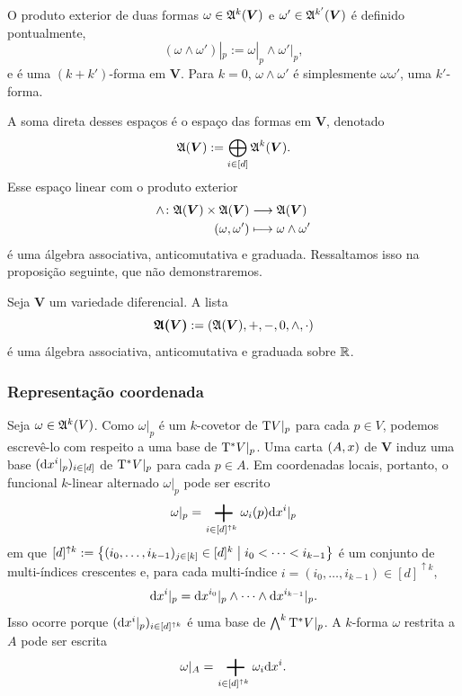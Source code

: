O produto exterior de duas formas $\omega \in \mathfrak{A}^k (\bm V)$ e $\omega' \in \mathfrak{A}^{k'} (\bm V)$ é definido pontualmente,
	\begin{equation*}
	(\omega \wedge \omega')|_p := \omega|_p \wedge \omega'|_p,
	\end{equation*}
e é uma $(k+k')$-forma em $\bm V$. Para $k=0$, $\omega \wedge \omega'$ é simplesmente $\omega\omega'$, uma $k'$-forma.

A soma direta desses espaços é o espaço das formas em $\bm V$, denotado
	\begin{equation*}
	\mathfrak{A} (\bm V) := \bigoplus_{i \in [d]} \mathfrak{A}^k (\bm V).
	\end{equation*}
Esse espaço linear com o produto exterior
	\begin{align*}
	{\wedge}\colon {\mathfrak{A}(\bm V) \times \mathfrak{A}(\bm V)} &\longrightarrow {\mathfrak{A}(\bm V)} \\{(\omega,\omega')} &\longmapsto \omega \wedge \omega'
	\end{align*}
é uma álgebra associativa, anticomutativa e graduada. Ressaltamos isso na proposição seguinte, que não demonstraremos.

\begin{proposition}
Seja $\bm V$ um variedade diferencial. A lista
	\begin{equation*}
	\bm{\mathfrak{A}(\bm V)} := (\mathfrak{A}(\bm V),+,-,0,\wedge,\cdot)
	\end{equation*}
é uma álgebra associativa, anticomutativa e graduada sobre $\mathbb{R}$.
\end{proposition}

\subsubsection{Representação coordenada}

Seja $\omega \in \mathfrak{A}^k(V)$. Como $\omega|_p$ é um $k$-covetor de $\mathrm{T} V|_p$ para cada $p \in V$, podemos escrevê-lo com respeito a uma base de $\mathrm{T}^{\ast} V|_p$. Uma carta $(A,x)$ de $\bm V$ induz uma base $(\mathrm{d}x^i|_p)_{i \in [d]}$ de $\mathrm{T}^{\ast} V|_p$ para cada $p \in A$. Em coordenadas locais, portanto, o funcional $k$-linear alternado $\omega|_p$ pode ser escrito
	\begin{equation*}
	\omega|_p = \sum_{i \in [d]^{\uparrow k}} \omega_i(p) \dd\x^i|_p
	\end{equation*}
em que $[d]^{\uparrow k} := \left\{{(i_0,\ldots,i_{k-1})_{j \in [k]} \in [d]^k}\;\middle\vert\;{i_0<\cdots<i_{k-1}}\right\}$ é um conjunto de multi-índices crescentes e, para cada multi-índice $i=(i_0,\ldots,i_{k-1}) \in [d]^{\uparrow k}$,
	\begin{equation*}
	\mathrm{d}x^i|_p = \mathrm{d}x^{i_0}|_p \wedge \cdots \wedge \mathrm{d} x^{i_{k-1}}|_p.
	\end{equation*}
Isso ocorre porque $(\mathrm{d}x^i|_p)_{i \in [d]^{\uparrow k}}$ é uma base de $\bigwedge^k\mathrm{T}^{\ast} V|_p$. A $k$-forma $\omega$ restrita a $A$ pode ser escrita
	\begin{equation*}
	\omega|_A = \sum_{i \in [d]^{\uparrow k}} \omega_i \dd\x^i.
	\end{equation*}

